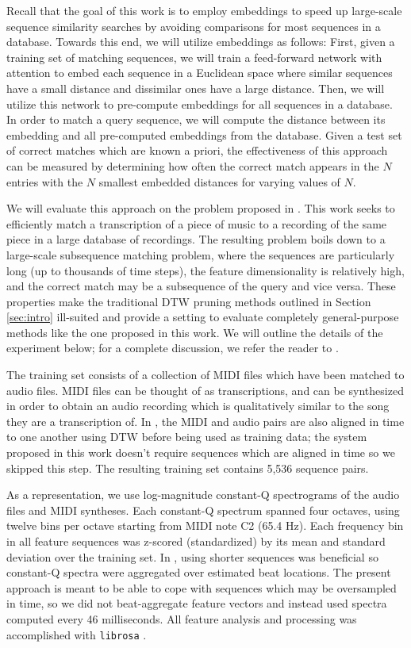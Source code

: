 \documentclass{article}
\begin{document}
Recall that the goal of this work is to employ embeddings to speed up large-scale sequence similarity searches by avoiding comparisons for most sequences in a database.
Towards this end, we will utilize embeddings as follows:
First, given a training set of matching sequences, we will train a feed-forward network with attention to embed each sequence in a Euclidean space where similar sequences have a small distance and dissimilar ones have a large distance.
Then, we will utilize this network to pre-compute embeddings for all sequences in a database.
In order to match a query sequence, we will compute the distance between its embedding and all pre-computed embeddings from the database.
Given a test set of correct matches which are known a priori, the effectiveness of this approach can be measured by determining how often the correct match appears in the $N$ entries with the $N$ smallest embedded distances for varying values of $N$.

We will evaluate this approach on the problem proposed in \cite{raffel2015large}.
This work seeks to efficiently match a transcription of a piece of music to a recording of the same piece in a large database of recordings.
The resulting problem boils down to a large-scale subsequence matching problem, where the sequences are particularly long (up to thousands of time steps), the feature dimensionality is relatively high, and the correct match may be a subsequence of the query and vice versa.
These properties make the traditional DTW pruning methods outlined in Section \ref{sec:intro} ill-suited and provide a setting to evaluate completely general-purpose methods like the one proposed in this work.
We will outline the details of the experiment below; for a complete discussion, we refer the reader to \cite{raffel2015large}.

The training set consists of a collection of MIDI files which have been matched to audio files.
MIDI files can be thought of as transcriptions, and can be synthesized in order to obtain an audio recording which is qualitatively similar to the song they are a transcription of.
In \cite{raffel2015large}, the MIDI and audio pairs are also aligned in time to one another using DTW before being used as training data; the system proposed in this work doesn't require sequences which are aligned in time so we skipped this step.
The resulting training set contains 5,536 sequence pairs.

As a representation, we use log-magnitude constant-Q spectrograms \cite{brown1991calculation} of the audio files and MIDI syntheses.
Each constant-Q spectrum spanned four octaves, using twelve bins per octave starting from MIDI note C2 (65.4 Hz).
Each frequency bin in all feature sequences was z-scored (standardized) by its mean and standard deviation over the training set.
In \cite{raffel2015large}, using shorter sequences was beneficial so constant-Q spectra were aggregated over estimated beat locations.
The present approach is meant to be able to cope with sequences which may be oversampled in time, so we did not beat-aggregate feature vectors and instead used spectra computed every 46 milliseconds.
All feature analysis and processing was accomplished with \texttt{librosa} \cite{mcfee2015librosa, mcfee2015librosa_scipy}.
\end{document}
